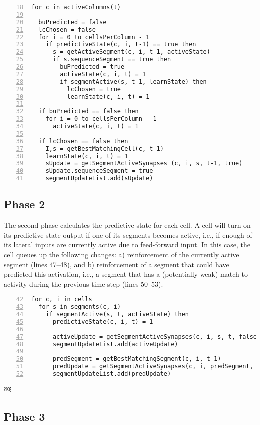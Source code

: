 \documentclass{report}
\begin{document}
\begin{lstlisting}[numbers=left,firstnumber=18]
for c in activeColumns(t)

  buPredicted = false
  lcChosen = false
  for i = 0 to cellsPerColumn - 1
    if predictiveState(c, i, t-1) == true then
      s = getActiveSegment(c, i, t-1, activeState)
      if s.sequenceSegment == true then
        buPredicted = true
        activeState(c, i, t) = 1
        if segmentActive(s, t-1, learnState) then
          lcChosen = true
          learnState(c, i, t) = 1

  if buPredicted == false then
    for i = 0 to cellsPerColumn - 1
      activeState(c, i, t) = 1

  if lcChosen == false then
    I,s = getBestMatchingCell(c, t-1)
    learnState(c, i, t) = 1
    sUpdate = getSegmentActiveSynapses (c, i, s, t-1, true)
    sUpdate.sequenceSegment = true
    segmentUpdateList.add(sUpdate)
\end{lstlisting}

\subsection*{Phase 2}

The second phase calculates the predictive state for each cell. A cell
will turn on its predictive state output if one of its segments
becomes active, i.e., if enough of its lateral inputs are currently
active due to feed-forward input. In this case, the cell queues up the
following changes: a) reinforcement of the currently active segment
(lines 47--48), and b) reinforcement of a segment that could have
predicted this activation, i.e., a segment that has a (potentially
weak) match to activity during the previous time step (lines 50--53).

\begin{lstlisting}[numbers=left,firstnumber=42]
for c, i in cells
  for s in segments(c, i)
    if segmentActive(s, t, activeState) then
      predictiveState(c, i, t) = 1

      activeUpdate = getSegmentActiveSynapses(c, i, s, t, false)
      segmentUpdateList.add(activeUpdate)

      predSegment = getBestMatchingSegment(c, i, t-1)
      predUpdate = getSegmentActiveSynapses(c, i, predSegment, t-1, true)
      segmentUpdateList.add(predUpdate)
\end{lstlisting}
￼
\subsection*{Phase 3}
\end{document}
